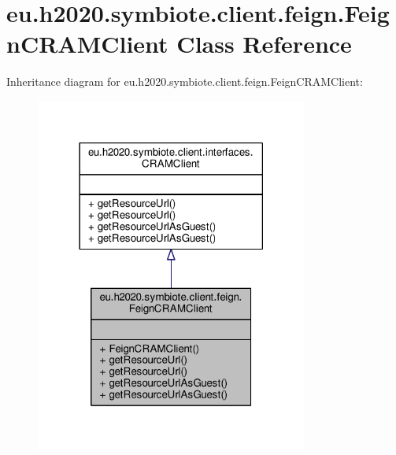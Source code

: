 \hypertarget{classeu_1_1h2020_1_1symbiote_1_1client_1_1feign_1_1FeignCRAMClient}{}\section{eu.\+h2020.\+symbiote.\+client.\+feign.\+Feign\+C\+R\+A\+M\+Client Class Reference}
\label{classeu_1_1h2020_1_1symbiote_1_1client_1_1feign_1_1FeignCRAMClient}


Inheritance diagram for eu.\+h2020.\+symbiote.\+client.\+feign.\+Feign\+C\+R\+A\+M\+Client\+:\nopagebreak
\begin{figure}[H]
\begin{center}
\leavevmode
\includegraphics[width=254pt]{classeu_1_1h2020_1_1symbiote_1_1client_1_1feign_1_1FeignCRAMClient__inherit__graph}
\end{center}
\end{figure}


